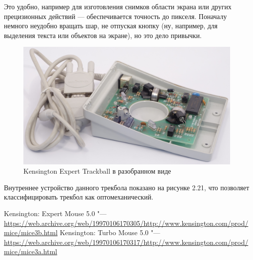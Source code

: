 \documentclass[11pt, a4paper]{article}
\begin{document}
Это удобно, например для изготовления снимков области экрана или других прецизионных действий — обеспечивается точность до пикселя. Поначалу немного неудобно вращать шар, не отпуская кнопку (ну, например, для выделения текста или объектов на экране), но это дело привычки. 

\begin{figure}[h]
    \centering
    \includegraphics[scale=0.4]{1996_kensington_expert_trackball_5/king2.jpg}
    \caption{Kensington Expert Trackball в разобранном виде}
    \label{fig:inside}
\end{figure}

Внутреннее устройство данного трекбола показано на рисунке 2.21, что позволяет классифицировать трекбол как оптомеханический.

\begin{thebibliography}{9}

 Kensington: Expert Mouse 5.0 "--- \url{https://web.archive.org/web/19970106170305/http://www.kensington.com/prod/mice/mice3b.html}
 Kensington: Turbo Mouse 5.0 "--- \url{https://web.archive.org/web/19970106170317/http://www.kensington.com/prod/mice/mice3a.html}
\end{thebibliography}
\end{document}
